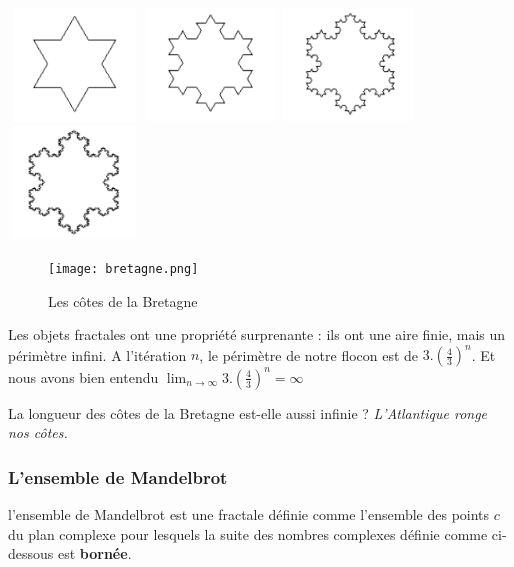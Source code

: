 \documentclass[11pt]{book}
\begin{document}
\includegraphics[width=3.5cm, height=3cm]{flocon1.pdf}
\includegraphics[width=3.5cm, height=3cm]{flocon2.pdf}
\includegraphics[width=3.5cm, height=3cm]{flocon3.pdf}
\includegraphics[width=3.5cm, height=3cm]{flocon4.pdf}


\begin{figure}[H]
	\centering
	\caption{Les côtes de la Bretagne}
	\texttt{[image: bretagne.png]}
\end{figure}
Les objets fractales ont une propriété surprenante : ils ont une aire finie, mais un périmètre infini.
A l'itération $n$, le périmètre de notre flocon est de $3.(\frac{4}{3})^n$. Et nous avons bien entendu 
$\lim_{n \rightarrow \infty} 3.(\frac{4}{3})^n =\infty $


La longueur des côtes de la Bretagne est-elle aussi infinie ?
\textit{L'Atlantique ronge nos côtes.} \cite{vh}

\subsubsection{L'ensemble de Mandelbrot}
l'ensemble de Mandelbrot est une fractale définie comme l'ensemble des points $c$ 
du plan complexe pour lesquels la suite des nombres complexes définie comme ci-dessous est 
\textbf{bornée}.
\end{document}
